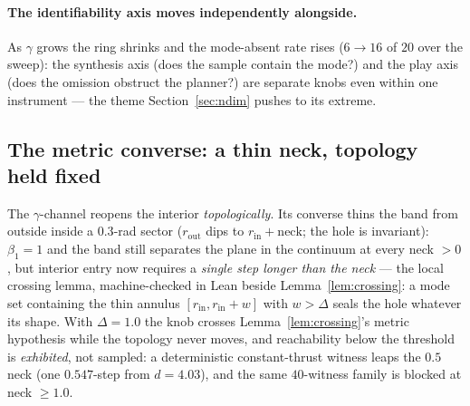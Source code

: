 \documentclass[11pt]{article}
\theoremstyle{remark}
\begin{document}
\paragraph{The identifiability axis moves independently alongside.} As
$\gamma$ grows the ring shrinks and the mode-absent rate rises ($6 \to 16$
of $20$ over the sweep): the synthesis axis (does the sample contain the
mode?) and the play axis (does the omission obstruct the planner?) are
separate knobs even within one instrument --- the theme
Section~\ref{sec:ndim} pushes to its extreme.

\subsection{The metric converse: a thin neck, topology held fixed}
\label{sec:thinneck}

The $\gamma$-channel reopens the interior \emph{topologically}. Its
converse thins the band from outside inside a $0.3$-rad sector
($r_{\mathrm{out}}$ dips to $r_{\mathrm{in}} + \mathrm{neck}$; the hole is
invariant): $\beta_1 = 1$ and the band still separates the plane in the
continuum at every neck $> 0$, but interior entry now requires a
\emph{single step longer than the neck} --- the local crossing lemma,
machine-checked in Lean beside Lemma~\ref{lem:crossing}: a mode set
containing the thin annulus $[r_{\mathrm{in}}, r_{\mathrm{in}} + w]$ with
$w > \Delta$ seals the hole whatever its shape. With $\Delta = 1.0$ the
knob crosses Lemma~\ref{lem:crossing}'s metric hypothesis while the
topology never moves, and reachability below the threshold is
\emph{exhibited}, not sampled: a deterministic constant-thrust witness
leaps the $0.5$ neck (one $0.547$-step from $d = 4.03$), and the same
$40$-witness family is blocked at neck $\ge 1.0$.
\end{document}
